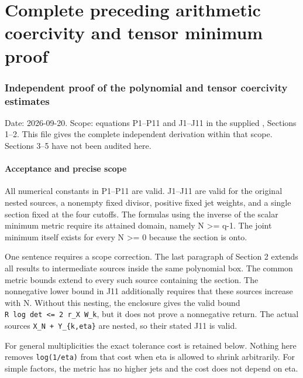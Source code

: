 \documentclass[11pt]{article}
\begin{document}
\endgroup

\clearpage\begingroup
\part*{Complete preceding arithmetic coercivity and tensor minimum proof}
\providecommand{\mrcoerctightlist}{\setlength{\itemsep}{0pt}\setlength{\parskip}{0pt}}

\section{Independent proof of the polynomial and tensor coercivity estimates}\label{mrcoerc:independent-proof-of-the-polynomial-and-tensor-coercivity-estimates}

Date: 2026-09-20. Scope: equations P1--P11 and J1--J11 in the supplied , Sections 1--2. This file gives the complete independent derivation within that scope. Sections 3--5 have not been audited here.

\subsection{Acceptance and precise scope}\label{mrcoerc:acceptance-and-precise-scope}

All numerical constants in P1--P11 are valid. J1--J11 are valid for the original nested sources, a nonempty fixed divisor, positive fixed jet weights, and a single section fixed at the four cutoffs. The formulas using the inverse of the scalar minimum metric require its attained domain, namely N \textgreater= q-1. The joint minimum itself exists for every N \textgreater= 0 because the section is onto.

One sentence requires a scope correction. The last paragraph of Section 2 extends all results to intermediate sources inside the same polynomial box. The common metric bounds extend to every such source containing the section. The nonnegative lower bound in J11 additionally requires that these sources increase with N. Without this nesting, the enclosure gives the valid bound \texttt{\textbar{}R\ log\ det\textbar{}\ \textless{}=\ 2\ r\_X\ W\_k}, but it does not prove a nonnegative return. The actual sources \texttt{X\_N\ +\ Y\_\{k,eta\}} are nested, so their stated J11 is valid.

For general multiplicities the exact tolerance cost is retained below. Nothing here removes \texttt{log(1/eta)} from that cost when eta is allowed to shrink arbitrarily. For simple factors, the metric has no higher jets and the cost does not depend on eta.
\end{document}

